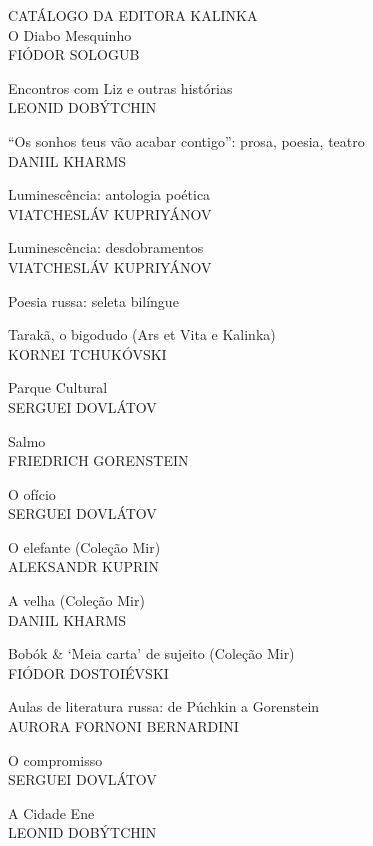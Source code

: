 \footnotesize{
\noindent{}CATÁLOGO DA EDITORA KALINKA\\[5pt]

\noindent{}O Diabo Mesquinho\\
FIÓDOR SOLOGUB
\medskip

\noindent{}Encontros com Liz e outras histórias\\
LEONID DOBÝTCHIN
\medskip

\noindent{}“Os sonhos teus vão acabar contigo”: prosa, poesia, teatro\\
DANIIL KHARMS
\medskip

\noindent{}Luminescência: antologia poética\\
VIATCHESLÁV KUPRIYÁNOV
\medskip

\noindent{}Luminescência: desdobramentos\\
VIATCHESLÁV KUPRIYÁNOV
\medskip

\noindent{}Poesia russa: seleta bilíngue
\medskip

\noindent{}Tarakã, o bigodudo (Ars et Vita e Kalinka)\\
KORNEI TCHUKÓVSKI
\medskip

\noindent{}Parque Cultural\\
SERGUEI DOVLÁTOV
\medskip

\noindent{}Salmo\\
FRIEDRICH GORENSTEIN
\medskip

\noindent{}O ofício\\
SERGUEI DOVLÁTOV
\medskip

\noindent{}O elefante (Coleção Mir)\\
ALEKSANDR KUPRIN
\medskip

\noindent{}A velha (Coleção Mir)\\
DANIIL KHARMS 
\medskip

\noindent{}Bobók \& ‘Meia carta’ de sujeito (Coleção Mir)\\
FIÓDOR DOSTOIÉVSKI
\medskip

\noindent{}Aulas de literatura russa: de Púchkin a Gorenstein \\
AURORA FORNONI BERNARDINI
\medskip

\noindent{}O compromisso\\
SERGUEI DOVLÁTOV
\medskip

\noindent{}A Cidade Ene \\
LEONID DOBÝTCHIN
}

